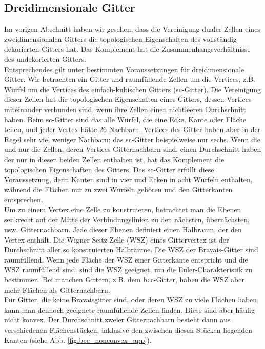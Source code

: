 \subsection{Dreidimensionale Gitter}
Im vorigen Abschnitt haben wir gesehen, dass die Vereinigung dualer Zellen eines zweidimensionalen Gitters die topologischen Eigenschaften des vollst\"andig dekorierten Gitters hat. Das Komplement hat die Zusammenhangsverh\"altnisse des undekorierten Gitters.\\
Entsprechendes gilt unter bestimmten Voraussetzungen f\"ur dreidimensionale Gitter. Wir betrachten ein Gitter und raumf\"ullende Zellen um die Vertices, z.B. W\"urfel um die Vertices des einfach-kubischen Gitters (sc-Gitter). Die Vereinigung dieser Zellen hat die topologischen Eigenschaften eines Gitters, dessen Vertices miteinander verbunden sind, wenn ihre Zellen einen nichtleeren Durchschnitt haben. Beim sc-Gitter sind das alle W\"urfel, die eine Ecke, Kante oder Fl\"ache teilen, und jeder Vertex h\"atte 26 Nachbarn. Vertices des Gitter haben aber in der Regel sehr viel weniger Nachbarn; das sc-Gitter beispielweise nur sechs. Wenn die und nur die Zellen, deren Vertices Gitternachbarn sind, einen Durchschnitt haben der nur in diesen beiden Zellen enthalten ist, hat das Komplement die topologischen Eigenschaften des Gitters. Das sc-Gitter erf\"ullt diese Voraussetzung, denn Kanten sind in vier und Ecken in acht W\"urfeln enthalten, w\"ahrend die Fl\"achen nur zu zwei W\"urfeln geh\"oren und den Gitterkanten entsprechen. 
\\Um zu einem Vertex eine Zelle zu konstruieren, betrachtet man die Ebenen senkrecht auf der Mitte der Verbindungslinien zu den n\"achsten, \"ubern\"achsten, usw. Gitternachbarn. Jede dieser Ebenen definiert einen Halbraum, der den Vertex enth\"alt. Die Wigner-Seitz-Zelle (WSZ) eines Gittervertex ist der Durchschnitt aller so konstruierten Halbr\"aume. Die WSZ der Bravais-Gitter sind raumf\"ullend. Wenn jede Fl\"ache der WSZ einer Gitterkante entspricht und die WSZ raumf\"ullend sind, sind die WSZ geeignet, um die Euler-Charakteristik zu bestimmen. Bei manchen Gittern, z.B. dem bcc-Gitter, haben die WSZ aber mehr Fl\"achen als Gitternachbarn.
\\F\"ur Gitter, die keine Bravaisgitter sind, oder deren WSZ zu viele Fl\"achen haben, kann man dennoch geeignete raumf\"ullende Zellen finden. Diese sind aber h\"aufig nicht konvex. Der Durchschnitt zweier Gitternachbarn besteht dann aus verschiedenen Fl\"achenst\"ucken, inklusive den zwischen diesen St\"ucken liegenden Kanten (siehe Abb. \ref{fig:bcc_nonconvex_app}). 

